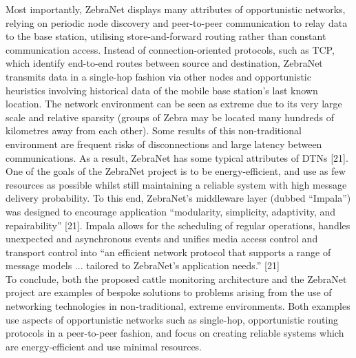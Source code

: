 \documentclass{article}
\begin{document}
\noindent Most importantly, ZebraNet displays many attributes of opportunistic networks, relying on periodic node discovery and peer-to-peer communication to relay data to the base station, utilising store-and-forward routing rather than constant communication access. Instead of connection-oriented protocols, such as TCP, which identify end-to-end routes between source and destination, ZebraNet transmits data in a single-hop fashion via other nodes and opportunistic heuristics involving historical data of the mobile base station's last known location. The network environment can be seen as extreme due to its very large scale and relative sparsity (groups of Zebra may be located many hundreds of kilometres away from each other). Some results of this non-traditional environment are frequent risks of disconnections and large latency between communications. As a result, ZebraNet has some typical attributes of DTNs [21].\\

\noindent One of the goals of the ZebraNet project is to be energy-efficient, and use as few resources as possible whilst still maintaining a reliable system with high message delivery probability. To this end, ZebraNet's middleware layer (dubbed ``Impala'') was designed to encourage application ``modularity, simplicity, adaptivity, and repairability'' [21]. Impala allows for the scheduling of regular operations, handles unexpected and asynchronous events and unifies media access control and transport control into ``an efficient network protocol that supports a range of message models ... tailored to ZebraNet's application needs.'' [21]\\

\noindent To conclude, both the proposed cattle monitoring architecture and the ZebraNet project are examples of bespoke solutions to problems arising from the use of networking technologies in non-traditional, extreme environments. Both examples use aspects of opportunistic networks such as single-hop, opportunistic routing protocols in a peer-to-peer fashion, and focus on creating reliable systems which are energy-efficient and use minimal resources. 

\vspace{50px}
\end{document}
